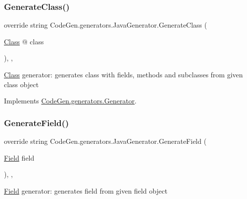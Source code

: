 \subsubsection{\texorpdfstring{Generate\+Class()}{GenerateClass()}}
{\footnotesize\ttfamily override string Code\+Gen.\+generators.\+Java\+Generator.\+Generate\+Class (\begin{DoxyParamCaption}\item[{\mbox{\hyperlink{classCodeGen_1_1generators_1_1Class}{Class}} @}]{class }\end{DoxyParamCaption})\hspace{0.3cm}{\ttfamily [inline]}, {\ttfamily [protected]}, {\ttfamily [virtual]}}



\mbox{\hyperlink{classCodeGen_1_1generators_1_1Class}{Class}} generator\+: generates class with fields, methods and subclasses from given class object  



Implements \mbox{\hyperlink{classCodeGen_1_1generators_1_1Generator_a8847fd8b6d408a0dfc087dcc1dc58340}{Code\+Gen.\+generators.\+Generator}}.

\mbox{\label{classCodeGen_1_1generators_1_1JavaGenerator_a84c05958d52e40e29a5a2157de4579e2}} 
\subsubsection{\texorpdfstring{Generate\+Field()}{GenerateField()}}
{\footnotesize\ttfamily override string Code\+Gen.\+generators.\+Java\+Generator.\+Generate\+Field (\begin{DoxyParamCaption}\item[{\mbox{\hyperlink{classCodeGen_1_1generators_1_1Field}{Field}}}]{field }\end{DoxyParamCaption})\hspace{0.3cm}{\ttfamily [inline]}, {\ttfamily [protected]}, {\ttfamily [virtual]}}



\mbox{\hyperlink{classCodeGen_1_1generators_1_1Field}{Field}} generator\+: generates field from given field object  



